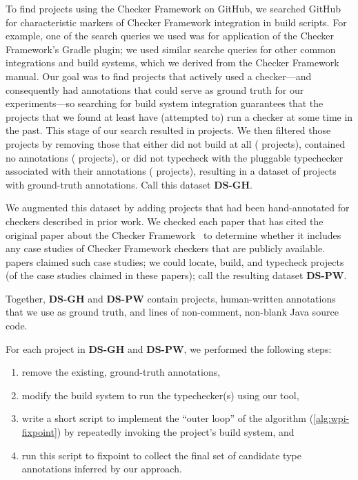 To find projects using the Checker Framework on GitHub, we searched GitHub for characteristic
markers of Checker Framework integration in build scripts. For example, one of the search
queries we used was for application of the Checker Framework's Gradle plugin; we used similar
searche queries for other common integrations and build systems, which we derived from
the Checker Framework manual. Our goal was to find projects that actively used a checker---and
consequently had annotations that could serve as ground truth for our experiments---so
searching for build system integration guarantees that the projects that we found at least
have (attempted to) run a checker at some time in the past. This stage of our search
resulted in  projects. We then filtered those projects by removing those that
either did not build at all ( projects), contained no annotations ( projects),
or did not typecheck with the pluggable typechecker associated with their annotations (
projects), resulting in a dataset of  projects with ground-truth annotations.
Call this dataset \textbf{DS-GH}.

We augmented this dataset by adding projects that had been hand-annotated for checkers
described in prior work. We checked each paper that has cited the original paper
about the Checker Framework~\cite{PapiACPE2008} to determine whether it includes any
case studies of Checker Framework checkers that are publicly available.  papers
claimed such case studies; we could locate, build, and typecheck  projects (of
the  case studies claimed in these papers); call the resulting dataset \textbf{DS-PW}.

Together, \textbf{DS-GH} and \textbf{DS-PW} contain  projects,  human-written
annotations that we use as ground truth, and  lines of non-comment, non-blank Java
source code.

For each project in \textbf{DS-GH} and \textbf{DS-PW}, we performed the following steps:
\begin{enumerate}
\item remove the existing, ground-truth annotations,
\item modify the build system to run the typechecker(s) using our tool,
\item write a short script to implement the ``outer loop'' of the algorithm
  (\ie \cref{alg:wpi-fixpoint}) by repeatedly invoking the project's build system, and
\item run this script to fixpoint to collect the final set of candidate type annotations
  inferred by our approach.
\end{enumerate}

